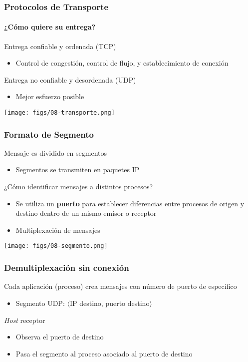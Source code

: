 \documentclass[letter]{beamer}
\begin{document}
\begin{frame}
  \frametitle{Protocolos de Transporte}
  \framesubtitle{¿Cómo quiere su entrega?}
  
  Entrega confiable y ordenada (TCP)
  \begin{itemize}
    \item Control de congestión, control de flujo, y establecimiento de conexión
  \end{itemize}
  Entrega no confiable y desordenada (UDP)
  \begin{itemize}
    \item Mejor esfuerzo posible
  \end{itemize}


  \begin{center}
    \texttt{[image: figs/08-transporte.png]}
  \end{center}

\end{frame}

\begin{frame}
  \frametitle{Formato de Segmento}

  Mensaje es dividido en segmentos
  \begin{itemize}
    \item Segmentos se transmiten en paquetes IP
  \end{itemize}
  ¿Cómo identificar mensajes a distintos procesos?
  \begin{itemize}
    \item Se utiliza un {\bf puerto} para establecer diferencias
          entre procesos de origen y destino dentro de un mismo emisor o receptor
    \item Multiplexación de mensajes
  \end{itemize}

  \begin{center}
    \texttt{[image: figs/08-segmento.png]}
  \end{center}

\end{frame}
\begin{frame}
  \frametitle{Demultiplexación sin conexión}

  Cada aplicación (proceso) crea mensajes con número de puerto de específico
  \begin{itemize}
    \item Segmento UDP: $\langle$IP destino, puerto destino$\rangle$
  \end{itemize}
  {\em Host} receptor
  \begin{itemize}
    \item Observa el puerto de destino
    \item Pasa el segmento al proceso asociado al puerto de destino
  \end{itemize}

\end{frame}
\end{document}
